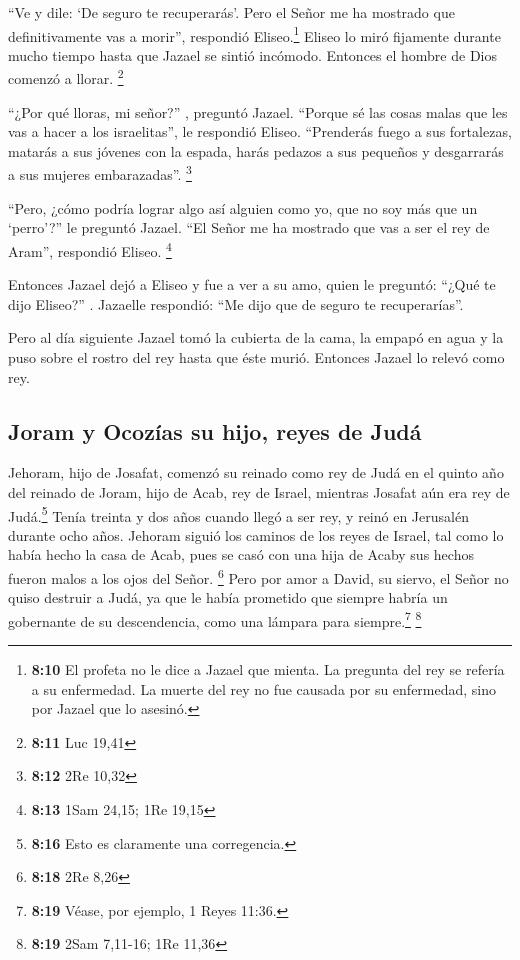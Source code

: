  ``Ve y dile: `De seguro te recuperarás'. Pero el Señor
me ha mostrado que definitivamente vas a morir'', respondió
Eliseo.\footnote{\textbf{8:10} El profeta no le dice a Jazael que
  mienta. La pregunta del rey se refería a su enfermedad. La muerte del
  rey no fue causada por su enfermedad, sino por Jazael que lo asesinó.}
 Eliseo lo miró fijamente durante mucho tiempo hasta que
Jazael se sintió incómodo. Entonces el hombre de Dios comenzó a llorar.
\footnote{\textbf{8:11} Luc 19,41}

 ``¿Por qué lloras, mi señor?'' , preguntó Jazael.
``Porque sé las cosas malas que les vas a hacer a los israelitas'', le
respondió Eliseo. ``Prenderás fuego a sus fortalezas, matarás a sus
jóvenes con la espada, harás pedazos a sus pequeños y desgarrarás a sus
mujeres embarazadas''. \footnote{\textbf{8:12} 2Re 10,32}

 ``Pero, ¿cómo podría lograr algo así alguien como yo,
que no soy más que un `perro'?'' le preguntó Jazael. ``El Señor me ha
mostrado que vas a ser el rey de Aram'', respondió Eliseo. \footnote{\textbf{8:13}
  1Sam 24,15; 1Re 19,15}

 Entonces Jazael dejó a Eliseo y fue a ver a su amo,
quien le preguntó: ``¿Qué te dijo Eliseo?'' . Jazaelle respondió: ``Me
dijo que de seguro te recuperarías''.

 Pero al día siguiente Jazael tomó la cubierta de la
cama, la empapó en agua y la puso sobre el rostro del rey hasta que éste
murió. Entonces Jazael lo relevó como rey.

\hypertarget{joram-y-ocozuxedas-su-hijo-reyes-de-juduxe1}{%
\subsection{Joram y Ocozías su hijo, reyes de
Judá}\label{joram-y-ocozuxedas-su-hijo-reyes-de-juduxe1}}

 Jehoram, hijo de Josafat, comenzó su reinado como rey de
Judá en el quinto año del reinado de Joram, hijo de Acab, rey de Israel,
mientras Josafat aún era rey de Judá.\footnote{\textbf{8:16} Esto es
  claramente una corregencia.}  Tenía treinta y dos años
cuando llegó a ser rey, y reinó en Jerusalén durante ocho años.
 Jehoram siguió los caminos de los reyes de Israel, tal
como lo había hecho la casa de Acab, pues se casó con una hija de Acaby
sus hechos fueron malos a los ojos del Señor. \footnote{\textbf{8:18}
  2Re 8,26}  Pero por amor a David, su siervo, el Señor
no quiso destruir a Judá, ya que le había prometido que siempre habría
un gobernante de su descendencia, como una lámpara para
siempre.\footnote{\textbf{8:19} Véase, por ejemplo, 1 Reyes 11:36.}
\footnote{\textbf{8:19} 2Sam 7,11-16; 1Re 11,36}

